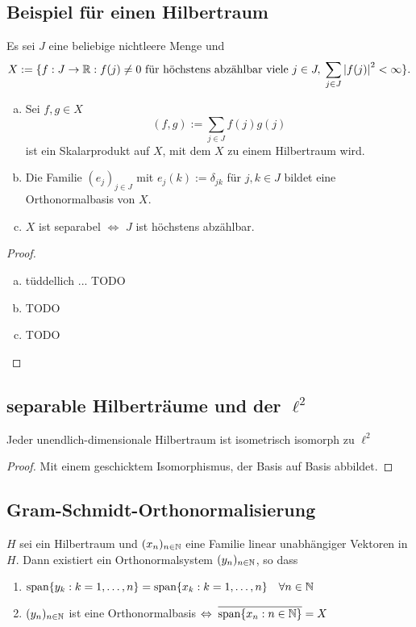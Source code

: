 \documentclass[FunkAnaSkriptSS2017.tex]{subfiles} %
\begin{document}
\subsection{ Beispiel für einen Hilbertraum}
Es sei $J$ eine beliebige nichtleere Menge und
	$$X:=\{ f: J \to \mathbb{R} : f(j) \not = 0 \text{ für höchstens abzählbar viele } j\in J,\; \sum_{j\in J} \left\lvert f(j) \right\rvert ^2 < \infty\}.$$
	\begin{enumerate}[(a)]
	\item Sei $f,g \in X$
		$$(f,g) := \sum_{j\in J} f(j)g(j) $$
		ist ein Skalarprodukt auf $X$, mit dem $X$ zu einem Hilbertraum wird.
	
	\item Die Familie $(e_j)_{j\in J}$ mit $e_j(k) := \delta_{jk} $ für $j,k\in J$ bildet eine Orthonormalbasis von $X$.
	
	\item $X$ ist separabel $\Leftrightarrow$ $J$ ist höchstens abzählbar.	
	\end{enumerate}
	
	\begin{proof}
	\begin{enumerate}[(a)]
		\item tüddellich ... TODO
		\item TODO
		\item TODO
	\end{enumerate}		
	
	\end{proof}
	
\subsection{ separable Hilberträume und der $\ell ^2$}
	Jeder unendlich-dimensionale Hilbertraum ist isometrisch isomorph zu $\ell^2$
	\begin{proof}
		Mit einem geschicktem Isomorphismus, der Basis auf Basis abbildet.
	\end{proof}
	
\subsection{ Gram-Schmidt-Orthonormalisierung}
	$H$ sei ein Hilbertraum und $(x_n)_{n\in \mathbb{N}}$ eine Familie linear unabhängiger Vektoren in $H$. Dann existiert ein Orthonormalsystem $(y_n)_{n\in \mathbb{N}}$, so dass
	\begin{enumerate}
		\item $\textnormal{span} \{ y_k : k = 1, \dots, n \} = \textnormal{span} \{ x_k : k = 1,\dots , n\} \quad \forall n\in \mathbb{N}$
		\item $(y_n)_{n\in\mathbb{N}}$ ist eine Orthonormalbasis $\Leftrightarrow \; \overline{\textnormal{span} \{ x_n : n\in\mathbb{N}\} } = X$
	\end{enumerate}
	
\end{document}
